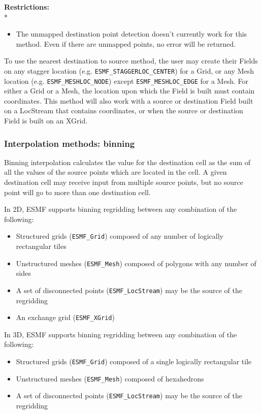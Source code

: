 \smallskip

\textbf{Restrictions:}\\*
\begin{itemize}
\item The unmapped destination point detection doesn't currently work for this method. Even if there are unmapped points, no error will be returned. 
\end{itemize}

\smallskip

 To use the nearest destination to source method, the user may create their Fields on any stagger location (e.g. {\tt ESMF\_STAGGERLOC\_CENTER}) for a Grid, or
 any Mesh location (e.g. {\tt ESMF\_MESHLOC\_NODE}) except {\tt ESMF\_MESHLOC\_EDGE} for a Mesh. For either a Grid or a Mesh, the location upon which the Field is built 
 must contain coordinates. This method will also work with a source or destination Field built on a LocStream that contains coordinates, or when the source 
or destination Field is built on an XGrid.

\subsubsection{Interpolation methods: binning}\label{sec:interpolation:binning}
 Binning interpolation calculates the value for the destination cell as the sum of all the values of the source points which are located in the cell.  A given destination cell may receive input from multiple source points, but no source point will go to more than one destination cell.

\smallskip

 In 2D, ESMF supports binning regridding between any combination of the following:
 \begin{itemize}
 \item Structured grids ({\tt ESMF\_Grid}) composed of any number of logically rectangular tiles
 \item Unstructured meshes ({\tt ESMF\_Mesh}) composed of polygons with any number of sides
 \item A set of disconnected points ({\tt ESMF\_LocStream}) may be the source of the regridding
 \item An exchange grid ({\tt ESMF\_XGrid})
 \end{itemize}

\smallskip

 In 3D, ESMF supports binning regridding between any combination of the following:
 \begin{itemize}
 \item Structured grids ({\tt ESMF\_Grid}) composed of a single logically rectangular tile
 \item Unstructured meshes ({\tt ESMF\_Mesh}) composed of hexahedrons 
 \item A set of disconnected points ({\tt ESMF\_LocStream}) may be the source of the regridding
 \end{itemize}

